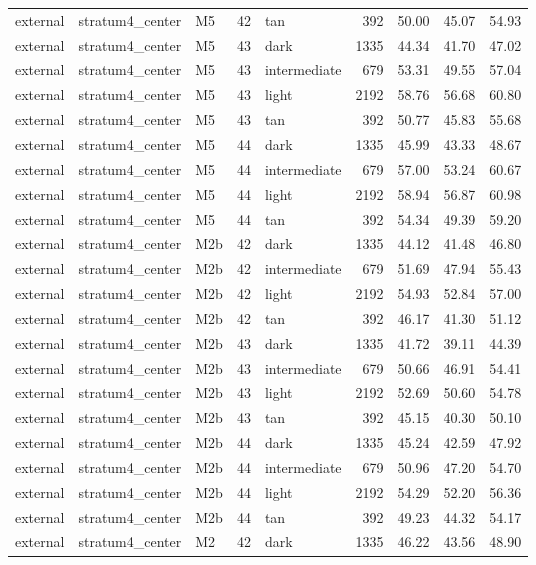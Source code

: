 \begin{tabular}{lllrlrrrr}
external & stratum4\_center & M5 & 42 & tan & 392 & 50.00 & 45.07 & 54.93 \\
external & stratum4\_center & M5 & 43 & dark & 1335 & 44.34 & 41.70 & 47.02 \\
external & stratum4\_center & M5 & 43 & intermediate & 679 & 53.31 & 49.55 & 57.04 \\
external & stratum4\_center & M5 & 43 & light & 2192 & 58.76 & 56.68 & 60.80 \\
external & stratum4\_center & M5 & 43 & tan & 392 & 50.77 & 45.83 & 55.68 \\
external & stratum4\_center & M5 & 44 & dark & 1335 & 45.99 & 43.33 & 48.67 \\
external & stratum4\_center & M5 & 44 & intermediate & 679 & 57.00 & 53.24 & 60.67 \\
external & stratum4\_center & M5 & 44 & light & 2192 & 58.94 & 56.87 & 60.98 \\
external & stratum4\_center & M5 & 44 & tan & 392 & 54.34 & 49.39 & 59.20 \\
external & stratum4\_center & M2b & 42 & dark & 1335 & 44.12 & 41.48 & 46.80 \\
external & stratum4\_center & M2b & 42 & intermediate & 679 & 51.69 & 47.94 & 55.43 \\
external & stratum4\_center & M2b & 42 & light & 2192 & 54.93 & 52.84 & 57.00 \\
external & stratum4\_center & M2b & 42 & tan & 392 & 46.17 & 41.30 & 51.12 \\
external & stratum4\_center & M2b & 43 & dark & 1335 & 41.72 & 39.11 & 44.39 \\
external & stratum4\_center & M2b & 43 & intermediate & 679 & 50.66 & 46.91 & 54.41 \\
external & stratum4\_center & M2b & 43 & light & 2192 & 52.69 & 50.60 & 54.78 \\
external & stratum4\_center & M2b & 43 & tan & 392 & 45.15 & 40.30 & 50.10 \\
external & stratum4\_center & M2b & 44 & dark & 1335 & 45.24 & 42.59 & 47.92 \\
external & stratum4\_center & M2b & 44 & intermediate & 679 & 50.96 & 47.20 & 54.70 \\
external & stratum4\_center & M2b & 44 & light & 2192 & 54.29 & 52.20 & 56.36 \\
external & stratum4\_center & M2b & 44 & tan & 392 & 49.23 & 44.32 & 54.17 \\
external & stratum4\_center & M2 & 42 & dark & 1335 & 46.22 & 43.56 & 48.90 \\

\end{tabular}
